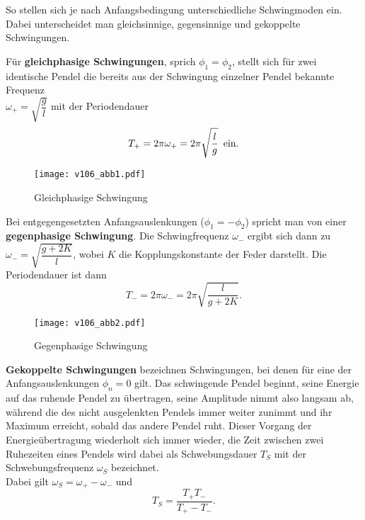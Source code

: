 So stellen sich je nach Anfangsbedingung unterschiedliche Schwingmoden ein. Dabei unterscheidet man gleichsinnige, gegensinnige und gekoppelte Schwingungen. \\

\newpage

Für \textbf{gleichphasige Schwingungen}, sprich $\phi_1=\phi_2$, stellt sich für zwei identische Pendel die bereits aus der Schwingung einzelner Pendel bekannte Frequenz \\ 
$\omega_+=\sqrt{\dfrac{g}{l}}$ mit der Periodendauer 
\begin{equation}
T_+ = 2\pi \omega_+ = 2\pi \sqrt{\dfrac{l}{g}} \text{\, ein.}
\label{eq:T_+}
\end{equation}

\begin{figure}
    \centering
    \texttt{[image: v106\_abb1.pdf]}
    \caption{Gleichphasige Schwingung}
\end{figure}

Bei entgegengesetzten Anfangsauslenkungen ($\phi_1=-\phi_2$) spricht man von einer \\ 
\textbf{gegenphasige Schwingung}. Die Schwingfrequenz $\omega_-$ ergibt sich dann zu \\
$\omega_- = \sqrt{\dfrac{g+2K}{l}}$, wobei $K$ die Kopplungskonstante der Feder darstellt.
Die Periodendauer ist dann 
\begin{equation}
    T_- = 2 \pi \omega_- = 2 \pi \sqrt{\dfrac{l}{g+2K}}\text{.}
\label{eq:T_-}
\end{equation}

\begin{figure}
    \centering
    \texttt{[image: v106\_abb2.pdf]}
    \caption{Gegenphasige Schwingung}
\end{figure}

\newpage

\textbf{Gekoppelte Schwingungen} bezeichnen Schwingungen, bei denen für eine der Anfangsauslenkungen $\phi_n = 0$ gilt.
Das schwingende Pendel beginnt, seine Energie auf das ruhende Pendel zu übertragen, seine Amplitude nimmt also langsam ab, während die des nicht ausgelenkten Pendels immer weiter zunimmt und ihr Maximum erreicht, sobald das andere Pendel ruht.
Dieser Vorgang der Energieübertragung wiederholt sich immer wieder, die Zeit zwischen zwei Ruhezeiten eines Pendels wird dabei als Schwebungsdauer $T_S$ mit der Schwebungsfrequenz $\omega_S$ bezeichnet. \\
Dabei gilt $\omega_S= \omega_+ -\omega_-$ und
\begin{equation}
    T_S = \dfrac{T_+ T_-}{T_+ - T_-} \text{.}
\label{eq:T_S}
\end{equation}

